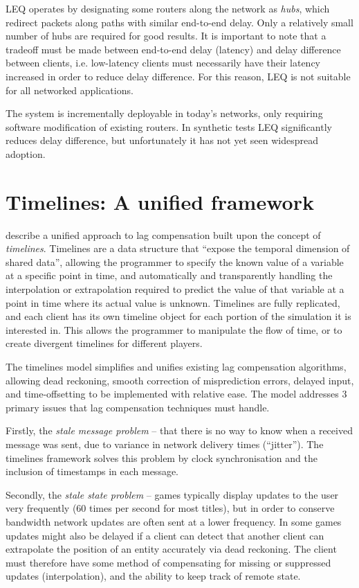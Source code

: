 \documentclass[conference]{IEEEtran}
\begin{document}
	LEQ operates by designating some routers along the network as \emph{hubs}, which redirect packets along paths with similar end-to-end delay. Only a relatively small number of hubs are required for good results. It is important to note that a tradeoff must be made between end-to-end delay (latency) and delay difference between clients, i.e. low-latency clients must necessarily have their latency increased in order to reduce delay difference. For this reason, LEQ is not suitable for all networked applications.

	The system is incrementally deployable in today's networks, only requiring software modification of existing routers. In synthetic tests LEQ significantly reduces delay difference, but unfortunately it has not yet seen widespread adoption.

	\section{Timelines: A unified framework}

	\Textcite{savery2013timelines} describe a unified approach to lag compensation built upon the concept of \emph{timelines}. Timelines are a data structure that ``expose the temporal dimension of shared data'', allowing the programmer to specify the known value of a variable at a specific point in time, and automatically and transparently handling the interpolation or extrapolation required to predict the value of that variable at a point in time where its actual value is unknown. Timelines are fully replicated, and each client has its own timeline object for each portion of the simulation it is interested in. This allows the programmer to manipulate the flow of time, or to create divergent timelines for different players.

	The timelines model simplifies and unifies existing lag compensation algorithms, allowing dead reckoning, smooth correction of misprediction errors, delayed input, and time-offsetting to be implemented with relative ease. The model addresses 3 primary issues that lag compensation techniques must handle.

	Firstly, the \emph{stale message problem} -- that there is no way to know when a received message was sent, due to variance in network delivery times (``jitter''). The timelines framework solves this problem by clock synchronisation and the inclusion of timestamps in each message.

	Secondly, the \emph{stale state problem} -- games typically display updates to the user very frequently (60 times per second for most titles), but in order to conserve bandwidth network updates are often sent at a lower frequency. In some games updates might also be delayed if a client can detect that another client can extrapolate the position of an entity accurately via dead reckoning. The client must therefore have some method of compensating for missing or suppressed updates (interpolation), and the ability to keep track of remote state.
\end{document}
